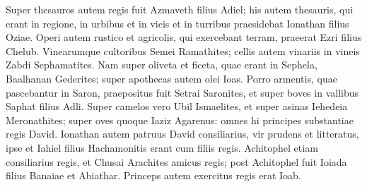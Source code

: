 \begin{biblechapter}
\verse Super thesauros autem regis fuit Azmaveth filius Adiel; his autem thesauris, qui erant in regione, in urbibus et in vicis et in turribus praesidebat Ionathan filius Oziae. 
\verse Operi autem rustico et agricolis, qui exercebant terram, praeerat Ezri filius Chelub. 
\verse Vinearumque cultoribus Semei Ramathites; cellis autem vinariis in vineis Zabdi Sephamatites. 
\verse Nam super oliveta et ficeta, quae erant in Sephela, Baalhanan Gederites; super apothecas autem olei Ioas. 
\verse Porro armentis, quae pascebantur in Saron, praepositus fuit Setrai Saronites, et super boves in vallibus Saphat filius Adli. 
\verse Super camelos vero Ubil Ismaelites, et super asinas Iehedeia Meronathites; 
\verse super oves quoque Iaziz Agarenus: omnes hi principes substantiae regis David. 
\verse Ionathan autem patruus David consiliarius, vir prudens et litteratus, ipse et Iahiel filius Hachamonitis erant cum filiis regis. 
\verse Achitophel etiam consiliarius regis, et Chusai Arachites amicus regis; 
\verse post Achitophel fuit Ioiada filius Banaiae et Abiathar. Princeps autem exercitus regis erat Ioab. 
\end{biblechapter}

